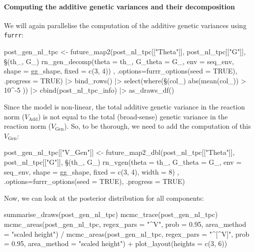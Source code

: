 \documentclass[a4paper,12pt,twoside]{article}
\begin{document}
\paragraph{Computing the additive genetic variances and their decomposition}
We will again parallelise the computation of the additive genetic variances using \texttt{furrr}:
\begin{Rinput}
post_gen_nl_tpc <-
    future_map2(post_nl_tpc[["Theta"]], post_nl_tpc[["G"]],
                \§§(th_, G_) { rn_gen_decomp(theta    = th_,
                                           G_theta  = G_,
                                           env      = seq_env,
                                           shape    = gg_shape,
                                           fixed    = c(3, 4)) },
                .options=furrr_options(seed = TRUE),
                .progress = TRUE) |>
    bind_rows() |>
    select(where(\§§(col_) { abs(mean(col_)) > 10^-5 })) |>
    cbind(post_nl_tpc_info) |>
    as_draws_df()
\end{Rinput}
Since the model is non-linear, the total additive genetic variance in the reaction norm ($V_{\text{Add}}$) is not equal to the total (broad-sense) genetic variance in the reaction norm ($V_{\text{Gen}}$). So, to be thorough, we need to add the computation of this $V_{\text{Gen}}$:
\begin{Rinput}
post_gen_nl_tpc[["V_Gen"]] <-
    future_map2_dbl(post_nl_tpc[["Theta"]], post_nl_tpc[["G"]],
                    \§§(th_, G_) { rn_vgen(theta    = th_,
                                        G_theta  = G_,
                                        env      = seq_env,
                                        shape    = gg_shape,
                                        fixed    = c(3, 4),
                                        width    = 8) },
                    .options=furrr_options(seed = TRUE),
                    .progress = TRUE)
\end{Rinput}
Now, we can look at the posterior distribution for all components:
\begin{Rinput}
summarise_draws(post_gen_nl_tpc)
mcmc_trace(post_gen_nl_tpc)
mcmc_areas(post_gen_nl_tpc,
           regex_pars = "^V",
           prob = 0.95,
           area_method = "scaled height") /
    mcmc_areas(post_gen_nl_tpc,
               regex_pars = "^[^V]",
               prob = 0.95,
               area_method = "scaled height") +
    plot_layout(heights = c(3, 6))
\end{Rinput}
\end{document}
